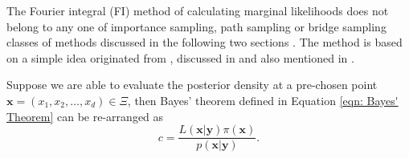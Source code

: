 \documentclass[%
 reprint,
 amsmath,amssymb,
 aps,
]{revtex4-2}
\def\bxi{\boldsymbol{\xi}}
\def\bxi{\boldsymbol{\xi}}
\def\ybold{\mathbf{y}}
\def\xbold{\mathbf{x}}
\begin{document}
The Fourier integral (FI) method of calculating marginal likelihoods does not belong to any one of importance sampling, path sampling or bridge sampling classes of methods discussed in the following two sections . The method is based on a simple idea originated from \cite{chib1995marginal}, discussed in \cite{chib2001marginal} and also mentioned in \cite{raftery1995hypothesis}. 

Suppose we are able to evaluate the posterior density at a pre-chosen point $\mathbf{x} = (x_1, x_2, \ldots, x_d) \in \Xi$, then Bayes' theorem  defined in Equation \eqref{eqn: Bayes' Theorem} can be re-arranged as
\begin{equation} \label{eqn: re-arranged Bayes' Theorem for FI method}
    c = \frac{L(\xbold | \ybold)\pi(\xbold)}{p(\xbold | \ybold)}.
\end{equation}

\end{document}
